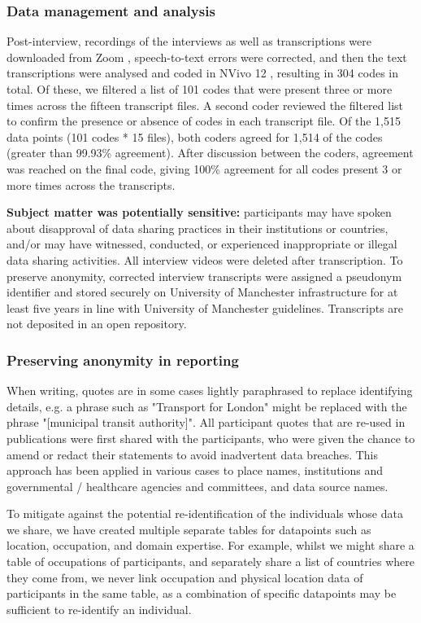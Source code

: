 \documentclass{CUP-JNL-DAP}%
\begin{document}
\subsubsection{Data management and analysis}
Post-interview, recordings of the interviews as well as transcriptions were downloaded from Zoom \cite{zoom_2022}, speech-to-text errors were corrected, and then the text transcriptions were analysed and coded in NVivo 12 \cite{qsr_international_pty_ltd_nvivo_2018}, resulting in 304 codes in total. Of these, we filtered a list of 101 codes that were present three or more times across the fifteen transcript files. A second coder reviewed the filtered list to confirm the presence or absence of codes in each transcript file. Of the 1,515 data points (101 codes * 15 files), both coders agreed for 1,514 of the codes (greater than 99.93\% agreement). After discussion between the coders, agreement was reached on the final code, giving 100\% agreement for all codes present 3 or more times across the transcripts. 

\textbf{Subject matter was potentially sensitive:} participants may have spoken about disapproval of data sharing practices in their institutions or countries, and/or may have witnessed, conducted, or experienced inappropriate or illegal data sharing activities. All interview videos were deleted after transcription. To preserve anonymity, corrected interview transcripts were assigned a pseudonym identifier and stored securely on University of Manchester infrastructure for at least five years in line with University of Manchester guidelines. Transcripts are not deposited in an open repository. 

\subsubsection{Preserving anonymity in reporting}
When writing, quotes are in some cases lightly paraphrased to replace identifying details, e.g. a phrase such as "Transport for London" might be replaced with the phrase "[municipal transit authority]". All participant quotes that are re-used in publications were first shared with the participants, who were given the chance to amend or redact their statements to avoid inadvertent data breaches. This approach has been applied in various cases to place names, institutions and governmental / healthcare agencies and committees, and data source names. 

To mitigate against the potential re-identification of the individuals whose data we share, we have created multiple separate tables for datapoints such as location, occupation, and domain expertise. For example, whilst we might share a table of occupations of participants, and separately share a list of countries where they come from, we never link occupation and physical location data of participants in the same table, as a combination of specific datapoints may be sufficient to re-identify an individual.
\end{document}
